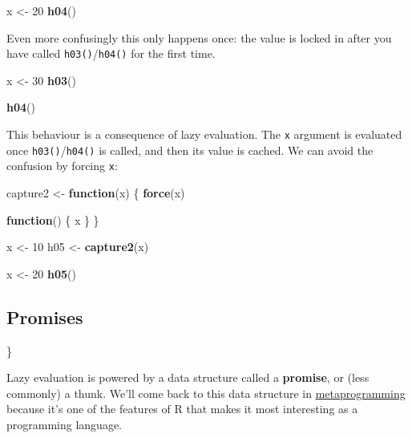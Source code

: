 \documentclass[]{book}
\newenvironment{Shaded}{\begin{snugshade}}{\end{snugshade}}
\newcommand{\ControlFlowTok}[1]{\textcolor[rgb]{0.13,0.29,0.53}{\textbf{#1}}}
\newcommand{\DecValTok}[1]{\textcolor[rgb]{0.00,0.00,0.81}{#1}}
\newcommand{\KeywordTok}[1]{\textcolor[rgb]{0.13,0.29,0.53}{\textbf{#1}}}
\newcommand{\NormalTok}[1]{#1}
\newcommand{\StringTok}[1]{\textcolor[rgb]{0.31,0.60,0.02}{#1}}
\theoremstyle{definition}
\theoremstyle{definition}
\theoremstyle{definition}
\theoremstyle{remark}
\begin{document}
\begin{Shaded}
\begin{Highlighting}[]
\NormalTok{x <-}\StringTok{ }\DecValTok{20}
\KeywordTok{h04}\NormalTok{()}
\end{Highlighting}
\end{Shaded}

Even more confusingly this only happens once: the value is locked in
after you have called \texttt{h03()}/\texttt{h04()} for the first time.

\begin{Shaded}
\begin{Highlighting}[]
\NormalTok{x <-}\StringTok{ }\DecValTok{30}
\KeywordTok{h03}\NormalTok{()}
\end{Highlighting}
\end{Shaded}

\begin{Shaded}
\begin{Highlighting}[]
\KeywordTok{h04}\NormalTok{()}
\end{Highlighting}
\end{Shaded}

This behaviour is a consequence of lazy evaluation. The \texttt{x}
argument is evaluated once \texttt{h03()}/\texttt{h04()} is called, and
then its value is cached. We can avoid the confusion by forcing
\texttt{x}:

\begin{Shaded}
\begin{Highlighting}[]
\NormalTok{capture2 <-}\StringTok{ }\ControlFlowTok{function}\NormalTok{(x) \{}
  \KeywordTok{force}\NormalTok{(x)}
  
  \ControlFlowTok{function}\NormalTok{() \{}
\NormalTok{    x}
\NormalTok{  \}}
\NormalTok{\}}

\NormalTok{x <-}\StringTok{ }\DecValTok{10}
\NormalTok{h05 <-}\StringTok{ }\KeywordTok{capture2}\NormalTok{(x)}

\NormalTok{x <-}\StringTok{ }\DecValTok{20}
\KeywordTok{h05}\NormalTok{()}
\end{Highlighting}
\end{Shaded}

\hypertarget{promises}{%
\subsection{Promises}\label{promises}}

\}

Lazy evaluation is powered by a data structure called a
\textbf{promise}, or (less commonly) a thunk. We'll come back to this
data structure in \protect\hyperlink{meta}{metaprogramming} because it's
one of the features of R that makes it most interesting as a programming
language.
\end{document}
